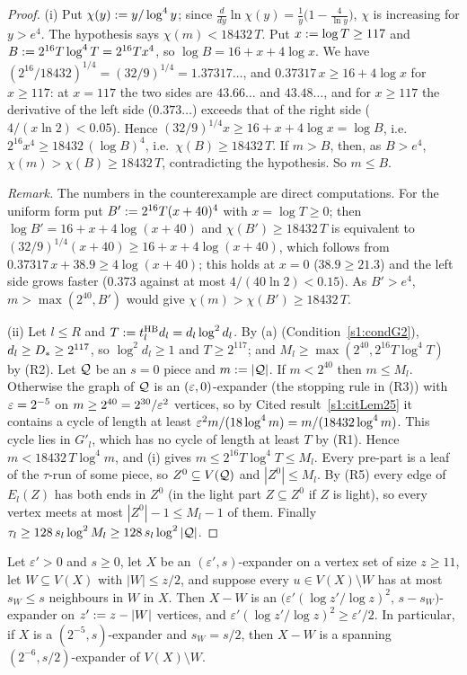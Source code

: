 \begin{proof}
(i) Put $\chi(y)\mathrel{:=} y/\log^4y$; since $\frac{d}{dy}\ln \chi(y)=\frac1y\bigl(1-
\frac4{\ln y}\bigr)$, $\chi$ is increasing for $y>e^4$. The hypothesis says
$\chi(m)<18432\,T$. Put $x\mathrel{:=}\log T\ge117$ and $B\mathrel{:=}2^{16}T\log^4T=2^{16}Tx^4$,
so $\log B=16+x+4\log x$. We have $(2^{16}/18432)^{1/4}=(32/9)^{1/4}=1.37317\ldots$,
and $0.37317\,x\ge16+4\log x$ for $x\ge117$: at $x=117$ the two sides are
$43.66\ldots$ and $43.48\ldots$, and for $x\ge117$ the derivative of the left
side ($0.373\ldots$) exceeds that of the right side ($4/(x\ln2)<0.05$). Hence
$(32/9)^{1/4}x\ge16+x+4\log x=\log B$, i.e.\ $2^{16}x^4\ge18432\,(\log B)^4$,
i.e.\ $\chi(B)\ge18432\,T$. If $m>B$, then, as $B>e^4$, $\chi(m)>\chi(B)\ge18432\,T$,
contradicting the hypothesis. So $m\le B$.

\emph{Remark.} The numbers in the counterexample are direct computations. For
the uniform form put $B'\mathrel{:=}2^{16}T(x+40)^4$ with $x=\log T\ge0$; then $\log
B'=16+x+4\log(x+40)$ and $\chi(B')\ge18432\,T$ is equivalent to
$(32/9)^{1/4}(x+40)\ge16+x+4\log(x+40)$, which follows from
$0.37317\,x+38.9\ge4\log(x+40)$; this holds at $x=0$ ($38.9\ge21.3$) and the
left side grows faster ($0.373$ against at most $4/(40\ln2)<0.15$). As
$B'>e^4$, $m>\max(2^{40},B')$ would give $\chi(m)>\chi(B')\ge18432\,T$.

(ii) Let $l\le R$ and $T\mathrel{:=}t^{\mathrm{HB}}_ld_l=d_l\log^2d_l$. By (a)
(Condition~\ref{s1:condG2}), $d_l\ge D_{*}\ge2^{117}$, so $\log^2d_l\ge1$ and
$T\ge2^{117}$; and $M_l\ge\max(2^{40},2^{16}T\log^4T)$ by (R2). Let $\mathcal{Q}$ be an
$s=0$ piece and $m\mathrel{:=}|\mathcal{Q}|$. If $m<2^{40}$ then $m\le M_l$. Otherwise the
graph of $\mathcal{Q}$ is an $(\varepsilon,0)$-expander (the stopping rule in (R3)) with
$\varepsilon=2^{-5}$ on $m\ge2^{40}=2^{30}/\varepsilon^2$ vertices, so by Cited
result~\ref{s1:citLem25} it contains a cycle of length at least
$\varepsilon^2m/(18\log^4m)=m/(18432\log^4m)$. This cycle lies in $G'_l$, which has no
cycle of length at least $T$ by (R1). Hence $m<18432\,T\log^4m$, and (i) gives
$m\le2^{16}T\log^4T\le M_l$. Every pre-part is a leaf of the $\tau$-run of some
piece, so $Z^0\subseteq V(\mathcal{Q})$ and $|Z^0|\le M_l$. By (R5) every edge of
$E_l(Z)$ has both ends in $Z^0$ (in the light part $Z\subseteq Z^0$ if $Z$ is
light), so every vertex meets at most $|Z^0|-1\le M_l-1$ of them. Finally
$\tau_l\ge128\,s_l\log^2M_l\ge128\,s_l\log^2|\mathcal{Q}|$.
\end{proof}

\begin{lemma}[Lemma HS]\label{s2:lemHS}
Let $\varepsilon'>0$ and $s\ge0$, let $X$ be an $(\varepsilon',s)$-expander on
a vertex set of size $z\ge11$, let $W\subseteq V(X)$ with $|W|\le z/2$, and
suppose every $u\in V(X)\setminus W$ has at most $s_W\le s$ neighbours in $W$ in
$X$. Then $X-W$ is an $\bigl(\varepsilon'(\log z'/\log z)^2,\,s-s_W\bigr)$-expander
on $z'\mathrel{:=} z-|W|$ vertices, and $\varepsilon'(\log z'/\log z)^2\ge
\varepsilon'/2$. In particular, if $X$ is a $(2^{-5},s)$-expander and
$s_W=s/2$, then $X-W$ is a spanning $(2^{-6},s/2)$-expander of $V(X)\setminus
W$.
\deps{\ref{s1:citDef11}}
\end{lemma}

